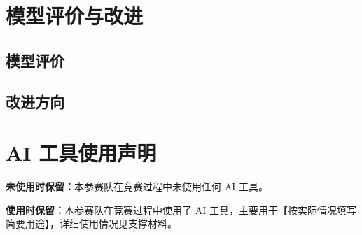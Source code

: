 \documentclass[withoutpreface,bwprint]{cumcmthesis}
\newif\ifmcmguidance
\newcommand{\MCMGuideField}[2]{\par\noindent\textbf{#1：}#2}
\newcommand{\MCMGuide}[7]{%
  \ifmcmguidance
    \begin{mcmguidebox}
      \small\color{black}
      {\color{mcmguidehead}\bfseries 写作指引}
      \MCMGuideField{目标}{#1}
      \MCMGuideField{必备清单}{#2}
      \MCMGuideField{语言风格}{#3}
      \MCMGuideField{篇幅与排版}{#4}
      \MCMGuideField{图表位置}{#5}
      \MCMGuideField{高分点}{#6}
      \MCMGuideField{错误警示}{#7}
    \end{mcmguidebox}
  \fi
}
\newcommand{\MCMEvaluationLength}{模型评价检出 51/59，跨度参考 1 [1,1] 页}
\newcommand{\MCMImprovementLength}{改进方案仅检出 19/59，跨度 1 [1,1] 页仅作定性参考}
\begin{document}
\section{模型评价与改进}
\MCMGuide
  {在证据范围内评价模型，并把局限转化为可执行改进。}
  {具体优点；误差来源；适用边界；所需新数据；改进模型；验证方案。}
  {优缺点绑定机制，不使用“简单、准确、适用范围广”等泛化形容。}
  {\MCMEvaluationLength；\MCMImprovementLength；评价与改进逐项对应。}
  {可用一张“局限—影响—改进—验证”表，避免装饰图。}
  {诚实说明未解决问题，同时给出能落地的下一步。}
  {只列套话；把增加模型复杂度当成改进；提出无法由现有/可得数据检验的方案。}

\subsection{模型评价}
\MCMGuide
  {说明哪些机制带来哪些能力，以及哪些假设限制了结论。}
  {优势证据；局限来源；影响方向；适用场景和禁用场景。}
  {采用“由于显式保留……，因此能够……”的因果链。}
  {\MCMEvaluationLength；优点和不足数量服从实际证据。}
  {一般不插图；复杂比较可用短表。}
  {每项评价能回指正文模型或检验。}
  {优点与任何模型都适用；缺点没有影响分析。}

\subsection{改进方向}
\MCMGuide
  {针对已确认局限提出新数据、模型和验证协议。}
  {对应局限；新增变量/约束；实现方式；计算代价；预期验证。}
  {按“缺陷—改法—验证”逐项写，不作无证据展望。}
  {\MCMImprovementLength；优先高影响、可执行改进。}
  {可用结构表，不需要概念性装饰图。}
  {改进可直接转化为代码或实验任务。}
  {只写“增加数据、优化算法”；没有对照指标。}

\section*{AI 工具使用声明}
\MCMGuide
  {按竞赛期间的真实使用情况，在参考文献之前保留且只保留一种官方声明。}
  {是否使用 AI；简要用途；与支撑材料的对应关系；逐项人工审查与核实记录。}
  {照录规定中的声明句，不增加“完全由 AI 完成”或“AI 对结果负责”等推责措辞。}
  {单独成节，紧接模型评价与改进，置于参考文献之前。}
  {本节不插图表。}
  {使用过 AI 时，\texttt{AI 工具使用详情.pdf}中的工具、目的、过程、采纳、修改与核验可回查。}
  {两种声明同时保留；声明与实际使用不符；把未经人工核实的 AI 输出直接作为核心成果。}
\ifmcmguidance
  \noindent\textbf{未使用时保留：}本参赛队在竞赛过程中未使用任何 AI 工具。

  \noindent\textbf{使用时保留：}本参赛队在竞赛过程中使用了 AI 工具，主要用于【按实际情况填写简要用途】，详细使用情况见支撑材料。
\end{document}
